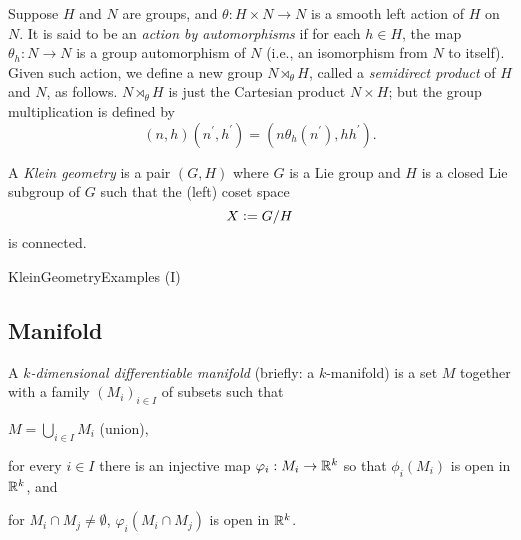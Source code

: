 \documentclass[stu, babel, american, biblatex, a4paper, leqno, draftall]{apa7}
\begin{document}
\begin{definition}\label{Group:SemidirectProduct}
    Suppose $H$ and $N$ are groups,
    and $\theta:H\times N\to N$ is a smooth left action of $H$ on $N$.
    It is said to be an \textit{action by automorphisms}
    if for each $h\in H$, the map $\theta_h:N\to N$ is a group automorphism of $N$ (i.e., an isomorphism from $N$ to itself).
    Given such action, we define a new group $N\rtimes_\theta H$,
    called a \textit{semidirect product} of $H$ and $N$, as follows.
    $N\rtimes_\theta H$ is just the Cartesian product $N\times H$;
    but the group multiplication is defined by
    $$\left(n,h\right)\left(n^\prime,h^\prime\right)=\left(n\theta_h\left(n^\prime\right),hh^\prime\right)\text{.}$$
\end{definition}

\begin{definition}\label{KleinGeometry}
    A \textit{Klein geometry} is a pair $\left(G, H\right)$
    where $G$ is a Lie group
    and $H$ is a closed Lie subgroup of $G$
    such that the (left) coset space $$X\vcentcolon= G / H$$ is connected.
\end{definition}
\begin{example}\label{KleinGeometryExample}
    KleinGeometryExamples (I)
\end{example}

\subsection{Manifold}

\begin{definition}\label{Manifold}
    A \textit{$k$-dimensional differentiable manifold} (briefly: a $k$-manifold)
    is a set $M$ together with a family $\left(M_i\right)_{i\in I}$ of subsets such that
    \begin{APAenumerate}
        \item $M=\bigcup_{i\in I} M_i$ (union),
        \item for every $i\in I$ there is an injective map $\varphi_i:M_i\to\mathbb{R}^k$ so that $\phi_i\left(M_i\right)$ is open in $\mathbb{R}^k$, and
        \item for $M_i\cap M_j\ne\emptyset$, $\varphi_i\left(M_i\cap M_j\right)$ is open in $\mathbb{R}^k$.
    \end{APAenumerate}
\end{definition}
\end{document}
